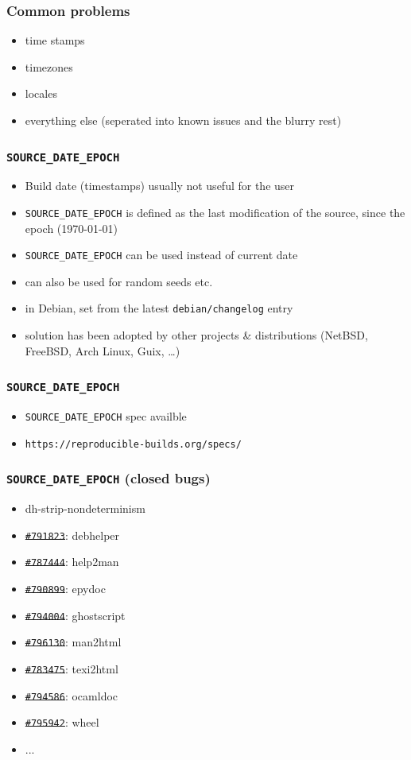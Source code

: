 \documentclass[14pt,aspectratio=169]{beamer}
\begin{document}
\begin{frame}
 \frametitle{Common problems}

 \begin{itemize}
  \item time stamps
  \item<2-3> timezones
  \item<2-3> locales
  \item<3> everything else (seperated into known issues and the blurry rest)
 \end{itemize}
\end{frame}


\begin{frame}
 \frametitle{\texttt{SOURCE\_DATE\_EPOCH}}

 \begin{itemize}
  \item Build date (timestamps) usually not useful for the user
  \item<2-3> \texttt{SOURCE\_DATE\_EPOCH} is defined as the last modification of
  the source, since the epoch (1970-01-01)
  \item<2-3> \texttt{SOURCE\_DATE\_EPOCH} can be used instead of current date
  \item<2-3> can also be used for random seeds etc.
  \item<3> in Debian, set from the latest \texttt{debian/changelog} entry
  \item<3> solution has been adopted by other projects \& distributions
  (NetBSD, FreeBSD, Arch Linux, Guix, …)
 \end{itemize}
\end{frame}

\begin{frame}
 \frametitle{\texttt{SOURCE\_DATE\_EPOCH}}

 \begin{itemize}
  \item \texttt{SOURCE\_DATE\_EPOCH} spec availble
  \item \texttt{https://reproducible-builds.org/specs/}
 \end{itemize}
\end{frame}


\begin{frame}
 \frametitle{\texttt{SOURCE\_DATE\_EPOCH} (closed bugs)}

 \begin{itemize}
  \item dh-strip-nondeterminism
  \item \sout{\texttt{\#791823}}: debhelper
  \item \sout{\texttt{\#787444}}: help2man
  \item \sout{\texttt{\#790899}}: epydoc
  \item \sout{\texttt{\#794004}}: ghostscript
  \item \sout{\texttt{\#796130}}: man2html
  \item \sout{\texttt{\#783475}}: texi2html
  \item \sout{\texttt{\#794586}}: ocamldoc
  \item \sout{\texttt{\#795942}}: wheel
  \item ...
 \end{itemize}
\end{frame}
\end{document}
